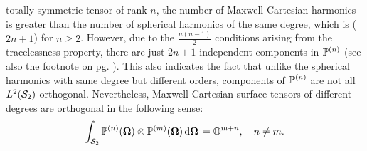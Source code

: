  totally symmetric tensor of rank $n$, the number of Maxwell-Cartesian harmonics is greater than the number of spherical 
 harmonics of the same degree, which is ($2n + 1$) for $n \geq 2$. However, due to the $\frac{n(n-1)}{2}$ conditions 
 arising from the tracelessness property, there are just $2n + 1$ independent components in $\PP$ (see also the footnote 
 on pg. \pageref{pg:indepc}). This also indicates the fact that unlike the spherical harmonics with same degree but
 different orders, components of $\PP$ are not all $\Lp[2](\Sphere)$-orthogonal. Nevertheless, Maxwell-Cartesian surface
  tensors of different degrees are orthogonal in the following sense:
\begin{equation}\label{eq:OG}
  \intA{\PP[n](\bomega) \otimes \PP[m](\bomega)} = \mathbb{O}^{m+n},\quad n\neq m.
\end{equation}

